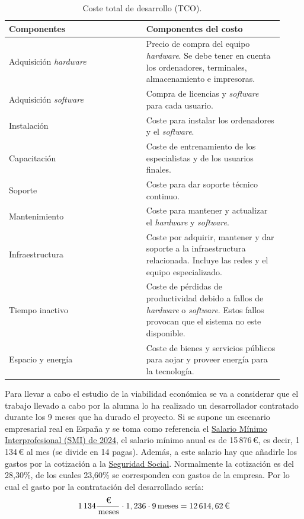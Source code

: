 \begin{table}[h]
	\centering
	\begin{tabularx}{\linewidth}{
    		>{\raggedright\arraybackslash}p{0.46\linewidth}
    		>{\raggedleft\arraybackslash}p{0.46\linewidth}}
		\toprule
		\textbf{Componentes}    & \textbf{Componentes del costo}\\
		\midrule
		Adquisición \textit{hardware} & Precio de compra del equipo \textit{hardware}. Se debe tener en cuenta los ordenadores, terminales, almacenamiento e impresoras. \\
		Adquisición \textit{software} & Compra de licencias y \textit{software} para cada usuario.  \\
		Instalación & Coste para instalar los ordenadores y el \textit{software}. \\
		Capacitación & Coste de entrenamiento de los especialistas y de los usuarios finales. \\
		Soporte & Coste para dar soporte técnico continuo. \\
		Mantenimiento & Coste para mantener y actualizar el \textit{hardware} y \textit{software}. \\
		Infraestructura & Coste por adquirir, mantener y dar soporte a la infraestructura relacionada. Incluye las redes y el equipo especializado. \\
		Tiempo inactivo & Coste de pérdidas de productividad debido a fallos de \textit{hardware} o \textit{software}. Estos fallos provocan que el sistema no este disponible. \\
		Espacio y energía & Coste de bienes y servicios públicos para aojar y proveer energía para la tecnología. \\
		\bottomrule
	\end{tabularx}
	\caption{Coste total de desarrollo (TCO).}
	\label{tabla:explicacion_TCO}
\end{table}

Para llevar a cabo el estudio de la viabilidad económica se va a considerar que el trabajo llevado a cabo por la alumna lo ha realizado un desarrollador contratado durante los 9 meses que ha durado el proyecto. Si se supone un escenario empresarial real en España y se toma como referencia el \href{https://www.boe.es/buscar/doc.php?id=BOE-A-2024-2251}{Salario Mínimo Interprofesional (SMI) de 2024}, el salario mínimo anual es de 15\,876\,€, es decir, 1\,134\,€ al mes (se divide en 14 pagas). Además, a este salario hay que añadirle los gastos por la cotización a la \href{https://www.seg-social.es/wps/portal/wss/internet/Trabajadores/CotizacionRecaudacionTrabajadores/36537}{Seguridad Social}. Normalmente la cotización es del 28,30\%, de los cuales 23,60\% se corresponden con gastos de la empresa. Por lo cual el gasto por la contratación del desarrollado sería:
$$
1\,134\frac{\,\text{\texteuro}}{\,\text{meses}} \cdot 1,236 \cdot 9\,\text{meses}
= 12\,614,62\,\text{\texteuro}
$$

